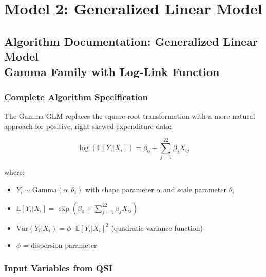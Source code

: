 \chapter{Model 2: Generalized Linear Model}\newpage

\section{{Algorithm Documentation: Generalized Linear Model\\Gamma Family with Log-Link Function}}

\subsection{Complete Algorithm Specification}

The Gamma GLM replaces the square-root transformation with a more natural approach for positive, right-skewed expenditure data:

\begin{equation}
\log(\mathbb{E}[Y_i | X_i]) = \beta_0 + \sum_{j=1}^{22} \beta_j X_{ij}
\end{equation}

where:
\begin{itemize}
    \item $Y_i \sim \text{Gamma}(\alpha, \theta_i)$ with shape parameter $\alpha$ and scale parameter $\theta_i$
    \item $\mathbb{E}[Y_i | X_i] = \exp\left(\beta_0 + \sum_{j=1}^{22} \beta_j X_{ij}\right)$
    \item $\text{Var}(Y_i | X_i) = \phi \cdot \mathbb{E}[Y_i | X_i]^2$ (quadratic variance function)
    \item $\phi$ = dispersion parameter
\end{itemize}

\subsection{Input Variables from QSI}

